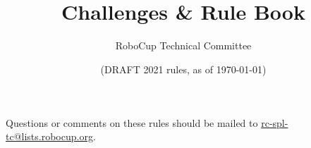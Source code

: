 \documentclass[12pt]{article}
\title{\leaguename\\
Challenges \& Rule Book}
\author{RoboCup Technical Committee}
\date{(DRAFT 2021 rules, as of \today)}
\begin{document}
  \maketitle

  \begin{center}
  Questions or comments on these rules should be mailed to \url{rc-spl-tc@lists.robocup.org}.
  \end{center}

  \newpage

  \setcounter{tocdepth}{4}
  \setcounter{secnumdepth}{4}
  \tableofcontents

  \thispagestyle{fancy}

  \clearpage

  \cfoot{\thepage}
  \setcounter{page}{1}

  \newpage

  
  \newpage
  
  \newpage
  
  \newpage
  
  \newpage
  
  \newpage
  
\end{document}
